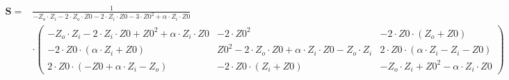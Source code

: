 $\begin{alignedat}{1}\mathbf{S}= & \frac{1}{-Z_o\cdot Z_i-2\cdot
Z_o\cdot Z0-2\cdot Z_i\cdot Z0-3\cdot Z0^2+\alpha\cdot Z_i\cdot Z0}\\
& \cdot \left(\begin{smallmatrix} -Z_o\cdot Z_i-2\cdot Z_i\cdot
Z0+Z0^2+\alpha\cdot Z_i\cdot Z0 & -2\cdot Z0^2 & -2\cdot Z0\cdot (Z_o
+Z0 ) \\ -2\cdot Z0 \cdot (\alpha\cdot Z_i +Z0 ) & Z0^2-2\cdot
Z_o\cdot Z0+\alpha\cdot Z_i\cdot Z0-Z_o\cdot Z_i & 2\cdot Z0\cdot
(\alpha\cdot Z_i-Z_i-Z0 ) \\ 2\cdot Z0\cdot (-Z0+\alpha\cdot Z_i-Z_o )
& -2\cdot Z0\cdot (Z_i+Z0 ) & -Z_o\cdot Z_i+Z0^2-\alpha\cdot Z_i\cdot
Z0 \end{smallmatrix}\right)\end{alignedat}$
